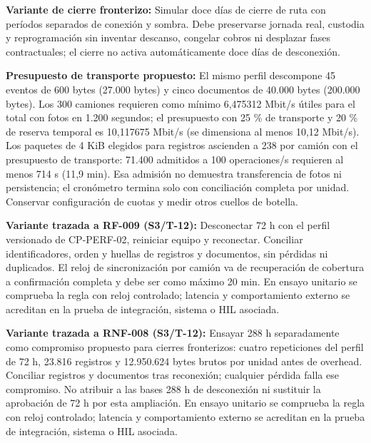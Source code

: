 \par\noindent\textbf{Variante de cierre fronterizo:} Simular doce días de cierre de ruta con períodos separados de conexión y sombra. Debe preservarse jornada real, custodia y reprogramación sin inventar descanso, congelar cobros ni desplazar fases contractuales; el cierre no activa automáticamente doce días de desconexión.\par

\par\noindent\textbf{Presupuesto de transporte propuesto:} El mismo perfil descompone 45 eventos de 600 bytes (27.000 bytes) y cinco documentos de 40.000 bytes (200.000 bytes). Los 300 camiones requieren como mínimo 6,475312 Mbit/s útiles para el total con fotos en 1.200 segundos; el presupuesto con 25 \% de transporte y 20 \% de reserva temporal es 10,117675 Mbit/s (se dimensiona al menos 10,12 Mbit/s). Los paquetes de 4 KiB elegidos para registros ascienden a 238 por camión con el presupuesto de transporte: 71.400 admitidos a 100 operaciones/s requieren al menos 714 s (11,9 min). Esa admisión no demuestra transferencia de fotos ni persistencia; el cronómetro termina solo con conciliación completa por unidad. Conservar configuración de cuotas y medir otros cuellos de botella.\par

\par\noindent\textbf{Variante trazada a RF-009 (S3/T-12):} Desconectar 72 h con el perfil versionado de CP-PERF-02, reiniciar equipo y reconectar. Conciliar identificadores, orden y huellas de registros y documentos, sin pérdidas ni duplicados. El reloj de sincronización por camión va de recuperación de cobertura a confirmación completa y debe ser como máximo 20 min. En ensayo unitario se comprueba la regla con reloj controlado; latencia y comportamiento externo se acreditan en la prueba de integración, sistema o HIL asociada.\par

\par\noindent\textbf{Variante trazada a RNF-008 (S3/T-12):} Ensayar 288 h separadamente como compromiso propuesto para cierres fronterizos: cuatro repeticiones del perfil de 72 h, 23.816 registros y 12.950.624 bytes brutos por unidad antes de overhead. Conciliar registros y documentos tras reconexión; cualquier pérdida falla ese compromiso. No atribuir a las bases 288 h de desconexión ni sustituir la aprobación de 72 h por esta ampliación. En ensayo unitario se comprueba la regla con reloj controlado; latencia y comportamiento externo se acreditan en la prueba de integración, sistema o HIL asociada.\par


